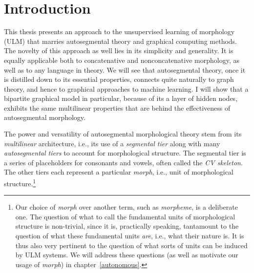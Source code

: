\chapter{Introduction}\label{ch:intro}

This thesis presents an approach to the unsupervised learning of morphology (ULM) that 
marries autosegmental theory \citep{mccarthy:1981} and graphical 
computing methods. The novelty of this approach as well
lies in its simplicity and generality. It is equally applicable both to concatenative and 
nonconcatenative morphology, as well as to any language in theory. We will see that
autosegmental theory, once it is distilled down to its essential properties, 
connects quite naturally to graph theory, and hence to graphical approaches 
to machine learning. I will show that a bipartite graphical model in particular, 
because of its a layer of hidden nodes, exhibits the same multilinear properties 
that are behind the effectiveness of autosegmental morphology. 

The power and versatility of autosegmental morphological theory \citep{mccarthy:1981}
stem from its \emph{multilinear} architecture, i.e., its
use of a \emph{segmental tier} along with many \emph{autosegmental tiers} 
to account for morphological structure. The segmental tier is
a series of placeholders for consonants and vowels, often called the
\emph{CV skeleton}. The other tiers each represent a particular \emph{morph}, i.e., unit of morphological structure.\footnote{Our choice of \emph{morph} over another term, such as \emph{morpheme}, is a deliberate  one. The question of what to call the fundamental units of morphological structure is non-trivial, since it is, practically speaking, tantamount to the question of what these fundamental units \emph{are}, i.e., what their nature is. It is thus also very pertinent to the question of what sorts of units can be induced by ULM systems. We will address these questions (as well as motivate our usage of \emph{morph}) in chapter~\ref{autonomous}.}
 
